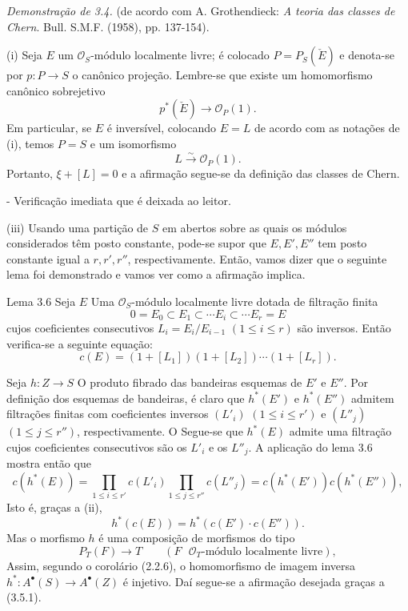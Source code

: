 \emph{Demonstração de 3.4.} (de acordo com A. Grothendieck: \emph{A teoria das classes de Chern}. Bull. S.M.F. (1958), pp. 137-154).

(i) Seja $E$ um $\mathcal O_S$-módulo localmente livre; é colocado $P=P_S(\check E)$ e denota-se por $p:P\to S$ o canônico projeção. Lembre-se que existe um homomorfismo canônico sobrejetivo
\[
p^*(\check E)\longrightarrow \mathcal O_P(1).
\]
Em particular, se $E$ é inversível, colocando $E=L$ de acordo com as notações de (i), temos $P=S$ e um isomorfismo
\[
L\xrightarrow{\sim}\mathcal O_P(1).
\]
Portanto, $\xi+[L]=0$ e a afirmação segue-se da definição das classes de Chern.

- Verificação imediata que é deixada ao leitor.

(iii) Usando uma partição de $S$ em abertos sobre as quais os módulos considerados têm posto constante, pode-se supor que $E,E',E''$ tem posto constante igual a $r,r',r''$, respectivamente. Então, vamos dizer que o seguinte lema foi demonstrado e vamos ver como a afirmação implica.

\begin{statement}{Lema 3.6}
Seja $E$ Uma $\mathcal O_S$-módulo localmente livre dotada de filtração finita
\[
0=E_0\subset E_1\subset\cdots E_i\subset\cdots E_r=E
\]
cujos coeficientes consecutivos $L_i=E_i/E_{i-1}$ $(1\le i\le r)$ são inversos. Então verifica-se a seguinte equação:
\[
c(E)=(1+[L_1])(1+[L_2])\cdots(1+[L_r]).
\]
\end{statement}

Seja $h:Z\to S$ O produto fibrado das bandeiras esquemas de $E'$ e $E''$. Por definição dos esquemas de bandeiras, é claro que $h^*(E')$ e $h^*(E'')$ admitem filtrações finitas com coeficientes inversos $(L'_i)$ $(1\le i\le r')$ e $(L''_j)$ $(1\le j\le r'')$, respectivamente. O Segue-se que $h^*(E)$ admite uma filtração cujos coeficientes consecutivos são os $L'_i$ e os $L''_j$. A aplicação do lema 3.6 mostra então que
\[
c(h^*(E))=
\prod_{1\le i\le r'}c(L'_i)\prod_{1\le j\le r''}c(L''_j)
=c(h^*(E'))c(h^*(E'')),
\]
Isto é, graças a (ii),
\[
h^*(c(E))=h^*(c(E')\cdot c(E'')).
\tag{3.5.1}
\]
Mas o morfismo $h$ é uma composição de morfismos do tipo
\[
P_T(F)\longrightarrow T
\qquad (F\text{ }\mathcal O_T\text{-módulo localmente livre}),
\]
Assim, segundo o corolário (2.2.6), o homomorfismo de imagem inversa $h^*:A^{\bullet}(S)\to A^{\bullet}(Z)$ é injetivo. Daí segue-se a afirmação desejada graças a (3.5.1).
